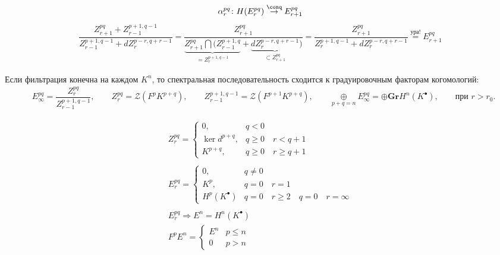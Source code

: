 \documentclass[../main.tex]{subfiles}
\begin{document}
\begin{itemize}
\begin{align*}
\alpha_r^{pq}\colon H(E_r^{pq})\overset{\conq}{\to} E_{r+1}^{pq}
\end{align*}
\begin{align*}\label{eq:factorZpoB}
\dfrac{Z_{r+1}^{pq}+Z_{r-1}^{p+1, q-1}}{Z_{r-1}^{p+1, q-1}+dZ_{r}^{p-r, q+r-1}}= \dfrac{ Z_{r+1}^{pq} }
{\underset{ = Z_r^{p+1, q-1}}{\underbrace{ Z_{r+1}^{pq}\bigcap(Z_{r-1}^{p+1, q}} } +\underset{\subset Z_{r+1}^{pq}} {\underbrace{dZ_{r}^{p-r, q+r-1}}})} = \dfrac{Z_{r+1}^{pq}}{Z_r^{p+1, q-1}+dZ_r^{p-r, q+r-1}} \overset{\text{ура!}}{=}E_{r+1}^{pq}
\end{align*}
\end{itemize}
Если фильтрация конечна на каждом $K^n$, то спектральная последовательность сходится к градуировочным факторам когомологий:
\begin{align*}
&E_{\infty}^{pq} = \dfrac{Z_r^{pq}}{Z_{r-1}^{p+1, q-1}}, \qquad
Z_r^{pq} = \mathcal{Z}(F^p K^{p+q}), \qquad
Z_{r-1}^{p+1, q-1} = \mathcal{Z}(F^{p+1}K^{p+q}),\qquad \underset{p+q=n}{\oplus}E_{\infty}^{pq} = \oplus \mathbf{Gr} H^n (K^\bullet),\qquad \text{при } r > r_0.
\end{align*}
\begin{to_ex}
\begin{align*}
Z^{pq}_r= \begin{cases} 0, & q<0 \\ \ker d^{p+q}, & q\ge 0\quad r< q+1\\ K^{p+q}, &q\ge 0 \quad r\ge q+1 \end{cases}
\\ \\
E_r^{pq}=\begin{cases} 0, & q \neq 0 \\ K^p, & q = 0 \quad r=1\\ H^p(K^\bullet) & q=0 \quad r\ge 2 \quad q=0 \quad r = \infty\end{cases}\\
\\
E_r^{pq} \Rightarrow E^n = H^n(K^\bullet)\\
F^pE^n = \begin{cases} E^n & p\le n \\ 0 &p > n\end{cases}
\end{align*}
\end{to_ex} 
\end{document}
